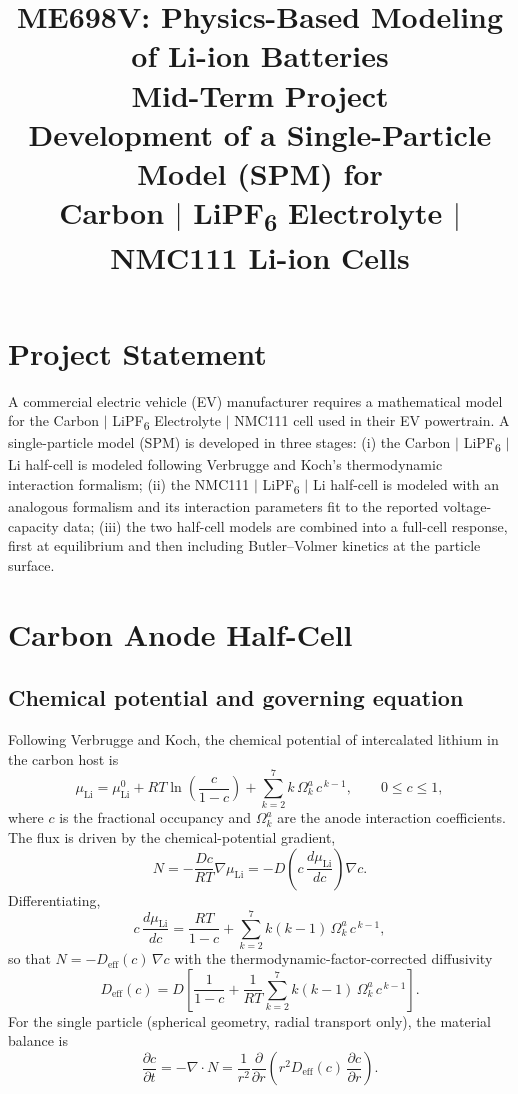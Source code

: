 \documentclass[11pt]{article}
\title{\vspace{-1.5cm}ME698V: Physics-Based Modeling of Li-ion Batteries \\[4pt]
\large Mid-Term Project \\[2pt]
\large Development of a Single-Particle Model (SPM) for \\
Carbon $|$ LiPF\textsubscript{6} Electrolyte $|$ NMC111 Li-ion Cells}
\author{}
\date{}
\begin{document}
\maketitle
\vspace{-1cm}

\section*{Project Statement}
A commercial electric vehicle (EV) manufacturer requires a mathematical model for the Carbon $|$ LiPF\textsubscript{6}
Electrolyte $|$ NMC111 cell used in their EV powertrain. A single-particle model (SPM) is developed in three stages:
(i) the Carbon $|$ LiPF\textsubscript{6} $|$ Li half-cell is modeled following Verbrugge and Koch's thermodynamic
interaction formalism; (ii) the NMC111 $|$ LiPF\textsubscript{6} $|$ Li half-cell is modeled with an analogous
formalism and its interaction parameters fit to the reported voltage-capacity data; (iii) the two half-cell models
are combined into a full-cell response, first at equilibrium and then including Butler--Volmer kinetics at the
particle surface.

\section{Carbon Anode Half-Cell}

\subsection{Chemical potential and governing equation}
Following Verbrugge and Koch, the chemical potential of intercalated lithium in the carbon host is
\begin{equation}
\mu_{\mathrm{Li}} = \mu_{\mathrm{Li}}^{0} + RT\ln\!\left(\frac{c}{1-c}\right) + \sum_{k=2}^{7} k\,\Omega_k^{a}\,c^{\,k-1},
\qquad 0\le c \le 1,
\end{equation}
where $c$ is the fractional occupancy and $\Omega_k^{a}$ are the anode interaction coefficients. The flux is driven
by the chemical-potential gradient,
\begin{equation}
N = -\frac{Dc}{RT}\nabla \mu_{\mathrm{Li}} = -D\!\left(c\,\frac{d\mu_{\mathrm{Li}}}{dc}\right)\nabla c .
\end{equation}
Differentiating,
\begin{equation}
c\,\frac{d\mu_{\mathrm{Li}}}{dc} = \frac{RT}{1-c} + \sum_{k=2}^{7} k(k-1)\,\Omega_k^{a}\,c^{\,k-1},
\end{equation}
so that $N = -D_{\mathrm{eff}}(c)\,\nabla c$ with the thermodynamic-factor-corrected diffusivity
\begin{equation}
D_{\mathrm{eff}}(c) = D\left[\frac{1}{1-c} + \frac{1}{RT}\sum_{k=2}^{7} k(k-1)\,\Omega_k^{a}\,c^{\,k-1}\right].
\label{eq:Deff_anode}
\end{equation}
For the single particle (spherical geometry, radial transport only), the material balance is
\begin{equation}
\frac{\partial c}{\partial t} = -\nabla\cdot N = \frac{1}{r^2}\frac{\partial}{\partial r}
\left(r^2 D_{\mathrm{eff}}(c)\,\frac{\partial c}{\partial r}\right).
\label{eq:pde_anode}
\end{equation}
\end{document}
